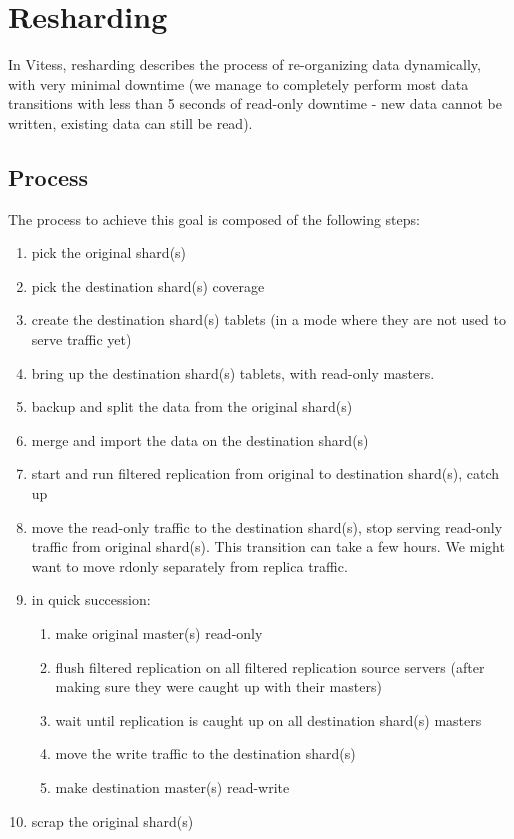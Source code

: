 \section{Resharding}\label{Resharding}

In Vitess, resharding describes the process of re-organizing data dynamically, with very minimal downtime (we manage to
completely perform most data transitions with less than 5 seconds of read-only downtime - new data cannot be written,
existing data can still be read).

\subsection{Process}\hypertarget{process}{}\label{process}

The process to achieve this goal is composed of the following steps:

\begin{enumerate}
\item pick the original shard(s)
\item pick the destination shard(s) coverage
\item create the destination shard(s) tablets (in a mode where they are not used to serve traffic yet)
\item bring up the destination shard(s) tablets, with read-only masters.
\item backup and split the data from the original shard(s)
\item merge and import the data on the destination shard(s)
\item start and run filtered replication from original to destination shard(s), catch up
\item move the read-only traffic to the destination shard(s), stop serving read-only traffic from original shard(s). This transition can take a few hours. We might want to move rdonly separately from replica traffic.
\item in quick succession:
   \begin{enumerate}
   \item make original master(s) read-only
   \item flush filtered replication on all filtered replication source servers (after making sure they were caught up with their masters)
   \item wait until replication is caught up on all destination shard(s) masters
   \item move the write traffic to the destination shard(s)
   \item make destination master(s) read-write
   \end{enumerate}
\item scrap the original shard(s)
\end{enumerate}


